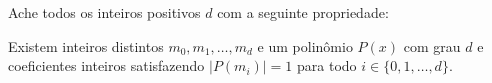Ache todos os inteiros positivos $d$ com a seguinte propriedade:

Existem inteiros distintos $m_0, m_1, \dots, m_d$ e um polinômio $P(x)$ com grau $d$ e coeficientes inteiros satisfazendo $\left|P(m_i)\right|=1$ para todo $i \in \{0, 1, \dots, d\}$.

